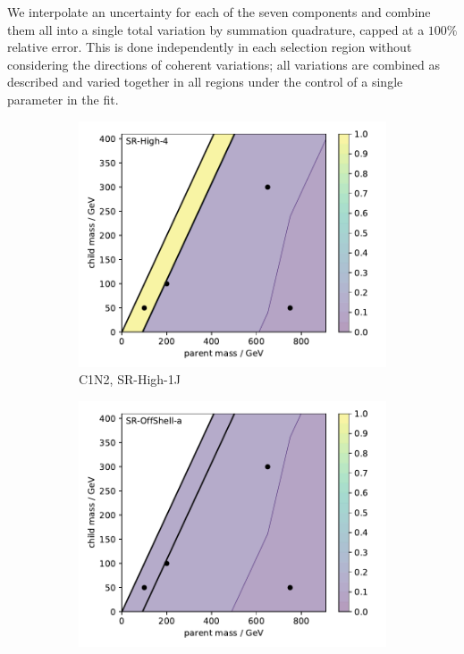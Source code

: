 We interpolate an uncertainty for each of the seven components and combine them
all into a single total variation by summation quadrature, capped at a $100\%$
relative error.
This is done independently in each selection region without considering the
directions of coherent variations; all variations are combined as described
and varied together in all regions under the control of a single parameter in
the fit.

\begin{figure}[tp]
\centering
\begin{subfigure}{0.495\textwidth}
\centering
\includegraphics[width=\textwidth]{figures/2ljets_signal_sys_c1n2_SRHigh4.pdf}
\caption{C1N2, SR-High-1J}
\end{subfigure}
\hfill
\begin{subfigure}{0.495\textwidth}
\centering
\includegraphics[width=\textwidth]{figures/2ljets_signal_sys_c1n2_SROffShell_1.pdf}

\end{subfigure}
\end{figure}
